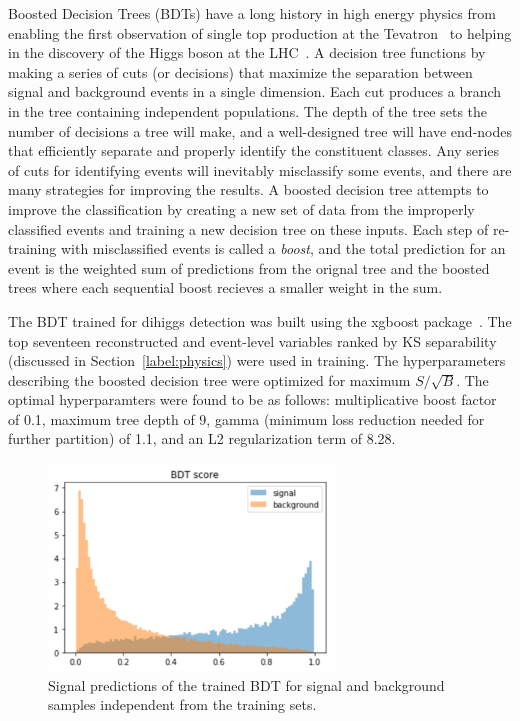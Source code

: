 \label{sec:BDT}
Boosted Decision Trees (BDTs) have a long history in high energy physics from enabling the first observation of single top production at the Tevatron~\cite{Abazov_2009} to helping in the discovery of the Higgs boson at the LHC~\cite{Aad_2012, Chatrchyan_2012}. A decision tree functions by making a series of cuts (or decisions) that maximize the separation between signal and background events in a single dimension. Each cut produces a branch in the tree containing independent populations. The depth of the tree sets the number of decisions a tree will make, and a well-designed tree will have end-nodes that efficiently separate and properly identify the constituent classes. Any series of cuts for identifying events will inevitably misclassify some events, and there are many strategies for improving the results. A boosted decision tree attempts to improve the classification by creating a new set of data from the improperly classified events and training a new decision tree on these inputs. Each step of re-training with misclassified events is called a \textit{boost}, and the total prediction for an event is the weighted sum of predictions from the orignal tree and the boosted trees where each sequential boost recieves a smaller weight in the sum.

The BDT trained for dihiggs detection was built using the xgboost package~\cite{xgboost}. The top seventeen reconstructed and event-level variables ranked by KS separability (discussed in Section~\ref{label:physics}) were used in training. The hyperparameters describing the boosted decision tree were optimized for maximum $S/\sqrt{B}$. The optimal hyperparamters were found to be as follows: multiplicative boost factor of 0.1, maximum tree depth of 9, gamma (minimum loss reduction needed for further partition) of 1.1, and an L2 regularization term of 8.28.

\begin{figure}[!h]
\begin{center}
\includegraphics[width=3in]{BDT/bdt_pred}
\caption{Signal predictions of the trained BDT for signal and background samples independent from the training sets.}
\label{fig:bdt_pred}
\end{center}
\end{figure}

